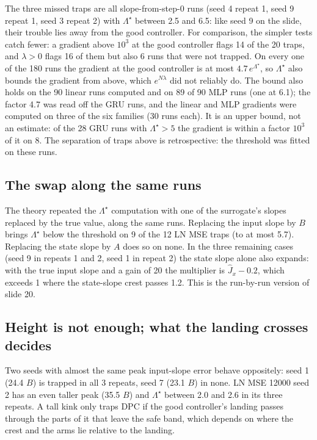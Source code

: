 \documentclass[11pt]{article}
\begin{document}
The three missed traps are all slope-from-step-0 runs (seed 4 repeat 1, seed 9 repeat 1, seed 3 repeat 2) with $\Lambda^\star$ between 2.5 and 6.5: like seed 9 on the slide, their trouble lies away from the good controller. For comparison, the simpler tests catch fewer: a gradient above $10^3$ at the good controller flags 14 of the 20 traps, and $\lambda>0$ flags 16 of them but also 6 runs that were not trapped. On every one of the 180 runs the gradient at the good controller is at most $4.7\,e^{\Lambda^\star}$, so $\Lambda^\star$ also bounds the gradient from above, which $e^{N\lambda}$ did not reliably do. The bound also holds on the 90 linear runs computed and on 89 of 90 MLP runs (one at 6.1); the factor 4.7 was read off the GRU runs, and the linear and MLP gradients were computed on three of the six families (30 runs each). It is an upper bound, not an estimate: of the 28 GRU runs with $\Lambda^\star>5$ the gradient is within a factor $10^3$ of it on 8. The separation of traps above is retrospective: the threshold was fitted on these runs.

\subsection{The swap along the same runs}

The theory repeated the $\Lambda^\star$ computation with one of the surrogate's slopes replaced by the true value, along the same runs. Replacing the input slope by $B$ brings $\Lambda^\star$ below the threshold on 9 of the 12 LN MSE traps (to at most 5.7). Replacing the state slope by $A$ does so on none. In the three remaining cases (seed 9 in repeats 1 and 2, seed 1 in repeat 2) the state slope alone also expands: with the true input slope and a gain of 20 the multiplier is $\hat J_x-0.2$, which exceeds 1 where the state-slope crest passes 1.2. This is the run-by-run version of slide 20.

\subsection{Height is not enough; what the landing crosses decides}

Two seeds with almost the same peak input-slope error behave oppositely: seed 1 (24.4 $B$) is trapped in all 3 repeats, seed 7 (23.1 $B$) in none. LN MSE 12000 seed 2 has an even taller peak (35.5 $B$) and $\Lambda^\star$ between 2.0 and 2.6 in its three repeats. A tall kink only traps DPC if the good controller's landing passes through the parts of it that leave the safe band, which depends on where the crest and the arms lie relative to the landing.
\end{document}
